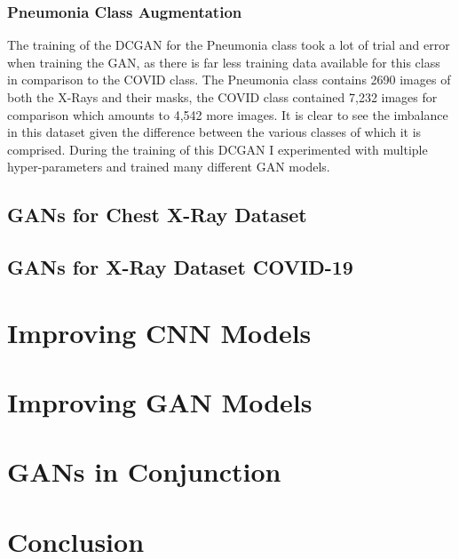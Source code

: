 \subsubsection{Pneumonia Class Augmentation}
The training of the DCGAN for the Pneumonia class took a lot of trial and error when training the GAN, as there is far less training data available for this class in comparison to the COVID class.  The Pneumonia class contains 2690 images of both the X-Rays and their masks, the COVID class contained 7,232 images for comparison which amounts to 4,542 more images.  It is clear to see the imbalance in this dataset given the difference between the various classes of which it is comprised.   During the training of this DCGAN I experimented with multiple hyper-parameters and trained many different GAN models.
\subsection{GANs for Chest X-Ray Dataset}
\subsection{GANs for X-Ray Dataset COVID-19}

\section{Improving CNN Models}
\section{Improving GAN Models}
\section{GANs in Conjunction}
\section{Conclusion}


